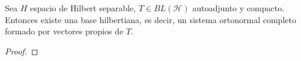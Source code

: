 \begin{teo}
    Sea $H$ espacio de Hilbert separable, $T \in BL(\mathcal{H})$ autoadjunto y compacto. Entonces existe una base hilbertiana, es decir, un sistema ortonormal completo formado por vectores propios de $T$.
\begin{proof} %

















\end{proof}
\end{teo}
